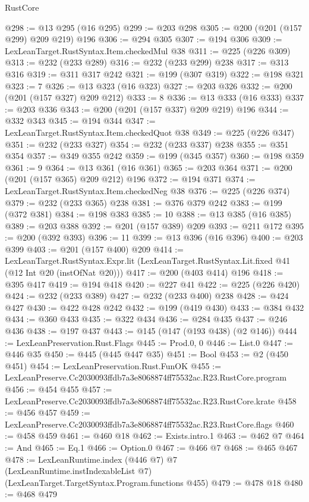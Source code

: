 \begin{lexlean}{RustCore}
\begin{coremodule}
@298 := @13 @295 (@16 @295)
@299 := @203 @298
@305 := @200 (@201 (@157 @299) @209 @219) @196
@306 := @294 @305
@307 := @194 @306
@309 := LexLeanTarget.RustSyntax.Item.checkedMul @38
@311 := @225 (@226 @309)
@313 := @232 (@233 @289)
@316 := @232 (@233 @299) @238
@317 := @313 @316
@319 := @311 @317 @242
@321 := @199 (@307 @319)
@322 := @198 @321
@323 := 7
@326 := @13 @323 (@16 @323)
@327 := @203 @326
@332 := @200 (@201 (@157 @327) @209 @212)
@333 := 8
@336 := @13 @333 (@16 @333)
@337 := @203 @336
@343 := @200 (@201 (@157 @337) @209 @219) @196
@344 := @332 @343
@345 := @194 @344
@347 := LexLeanTarget.RustSyntax.Item.checkedQuot @38
@349 := @225 (@226 @347)
@351 := @232 (@233 @327)
@354 := @232 (@233 @337) @238
@355 := @351 @354
@357 := @349 @355 @242
@359 := @199 (@345 @357)
@360 := @198 @359
@361 := 9
@364 := @13 @361 (@16 @361)
@365 := @203 @364
@371 := @200 (@201 (@157 @365) @209 @212) @196
@372 := @194 @371
@374 := LexLeanTarget.RustSyntax.Item.checkedNeg @38
@376 := @225 (@226 @374)
@379 := @232 (@233 @365) @238
@381 := @376 @379 @242
@383 := @199 (@372 @381)
@384 := @198 @383
@385 := 10
@388 := @13 @385 (@16 @385)
@389 := @203 @388
@392 := @201 (@157 @389) @209
@393 := @211 @172
@395 := @200 (@392 @393)
@396 := 11
@399 := @13 @396 (@16 @396)
@400 := @203 @399
@403 := @201 (@157 @400) @209
@414 := LexLeanTarget.RustSyntax.Expr.lit
    (LexLeanTarget.RustSyntax.Lit.fixed @41 (@12 Int @20 (instOfNat @20)))
@417 := @200 (@403 @414) @196
@418 := @395 @417
@419 := @194 @418
@420 := @227 @41
@422 := @225 (@226 @420)
@424 := @232 (@233 @389)
@427 := @232 (@233 @400) @238
@428 := @424 @427
@430 := @422 @428 @242
@432 := @199 (@419 @430)
@433 := @384 @432
@434 := @360 @433
@435 := @322 @434
@436 := @284 @435
@437 := @246 @436
@438 := @197 @437
@443 := @145 (@147 (@193 @438) (@2 @146))
@444 := LexLeanPreservation.Rust.Flags
@445 := Prod.{0, 0}
@446 := List.{0}
@447 := @446 @35
@450 := @445 (@445 @447 @35)
@451 := Bool
@453 := @2 (@450 @451)
@454 := LexLeanPreservation.Rust.FunOK
@455 := LexLeanPreserve.Cc2030093ffdb7a3e8068874ff75532ac.R23.RustCore.program
@456 := @454 @455
@457 := LexLeanPreserve.Cc2030093ffdb7a3e8068874ff75532ac.R23.RustCore.krate
@458 := @456 @457
@459 := LexLeanPreserve.Cc2030093ffdb7a3e8068874ff75532ac.R23.RustCore.flags
@460 := @458 @459
@461 := @460 @18
@462 := Exists.intro.{1}
@463 := @462 @7
@464 := And
@465 := Eq.{1}
@466 := Option.{0}
@467 := @466 @7
@468 := @465 @467
@478 := LexLeanRuntime.index
    (@446 @7)
    @7
    (LexLeanRuntime.instIndexableList @7)
    (LexLeanTarget.TargetSyntax.Program.functions @455)
@479 := @478 @18
@480 := @468 @479

\end{coremodule}
\end{lexlean}
